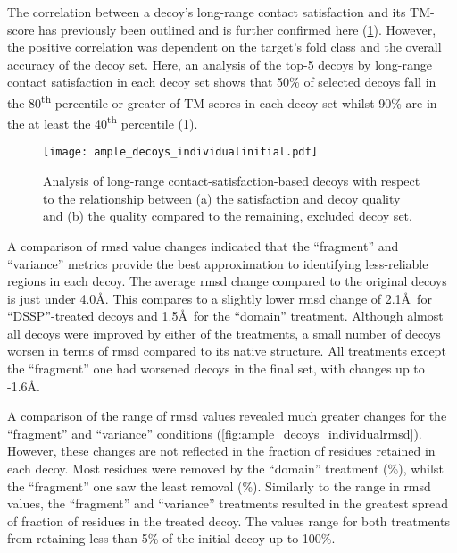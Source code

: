 The correlation between a decoy's long-range contact satisfaction and its TM-score has previously been outlined and is further confirmed here (\cref{fig:ample_decoys_individualinitial}). However, the positive correlation was dependent on the target's fold class and the overall accuracy of the decoy set. Here, an analysis of the top-5 decoys by long-range contact satisfaction in each decoy set shows that 50\% of selected decoys fall in the 80\textsuperscript{th} percentile or greater of TM-scores in each decoy set whilst 90\% are in the at least the 40\textsuperscript{th} percentile (\cref{fig:ample_decoys_individualinitial}). 

\begin{figure}[H]
	\centering
	\texttt{[image: ample\_decoys\_individualinitial.pdf]}
        \caption[Selection of single decoys by long-range satisfaction]{Analysis of long-range contact-satisfaction-based decoys with respect to the relationship between (a) the satisfaction and decoy quality and (b) the quality compared to the remaining, excluded decoy set.}
	\label{fig:ample_decoys_individualinitial}
\end{figure}

A comparison of \gls{rmsd} value changes indicated that the ``fragment'' and ``variance'' metrics provide the best approximation to identifying less-reliable regions in each decoy. The average \gls{rmsd} change compared to the original decoys is just under 4.0\AA. This compares to a slightly lower \gls{rmsd} change of 2.1\AA\ for ``DSSP''-treated decoys and 1.5\AA\ for the ``domain'' treatment. Although almost all decoys were improved by either of the treatments, a small number of decoys worsen in terms of \gls{rmsd} compared to its native structure. All treatments except the ``fragment'' one had worsened decoys in the final set, with changes up to -1.6\AA. 

A comparison of the range of \gls{rmsd} values revealed much greater changes for the ``fragment'' and ``variance'' conditions (\cref{fig:ample_decoys_individualrmsd}). However, these changes are not reflected in the fraction of residues retained in each decoy. Most residues were removed by the ``domain'' treatment (\%), whilst the ``fragment'' one saw the least removal (\%). Similarly to the range in \gls{rmsd} values, the ``fragment'' and ``variance'' treatments resulted in the greatest spread of fraction of residues in the treated decoy. The values range for both treatments from retaining less than 5\% of the initial decoy up to 100\%.

